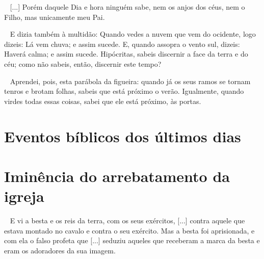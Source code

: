 \documentclass[12pt,aspectratio=169]{beamer}
\newcommand{\ver}[1]{%
    \raisebox{0.50ex}{%
        \scalebox{1.1}{%
            \pmb{\textbf{\textcolor{BSpbg}{#1}}}%
        }%
    }%
}
\newcommand{\QUOTE}[1]{%
    \par\noindent\hspace*{0.1\linewidth}%
    \begin{minipage}{0.8\linewidth}%
        \linespread{1.35}\large{#1}%
    \end{minipage}%
}
\newcommand{\RED}[1]{{\textcolor{TXred}{#1}}}
\newcommand{\ORA}[1]{{\textcolor{TXora}{#1}}}
\newcommand{\YEL}[1]{{\textcolor{TXyel}{#1}}}
\newcommand{\GRE}[1]{{\textcolor{TXgre}{#1}}}
\newcommand{\CYA}[1]{{\textcolor{TXcya}{#1}}}
\newcommand{\MAG}[1]{{\textcolor{TXmag}{#1}}}
\newcommand{\BRI}[1]{{\textcolor{BSpbg}{#1}}}   %
\begin{document}
    \begin{frame}
        \QUOTE{%
            \ver{(ARC) Mt~24.32--36}~%
            [...] Porém daquele \MAG{Dia e hora} ninguém sabe, nem os anjos dos céus, nem o
            Filho, mas unicamente meu Pai.
        }
    \end{frame}

    \begin{frame}
        \QUOTE{%
            \ver{(ARC) Lc~12.54--56}~%
            E \CYA{dizia} também à multidão: \YEL{Quando vedes}  a  \GRE{nuvem  que  vem  do
            ocidente}, logo \YEL{dizeis}: \GRE{Lá  vem  chuva};  \MAG{e  assim  sucede}.  E,
            \YEL{quando} \GRE{assopra o vento sul}, \YEL{dizeis}: \GRE{Haverá calma}; \MAG{e
            assim sucede}. \RED{Hipócritas, sabeis discernir a face da terra e do céu;  como
            não sabeis, então, discernir este tempo?}
        }
    \end{frame}

    \begin{frame}
        \QUOTE{%
            \ver{(ARC) Mt~24.32,33}~%
            \MAG{Aprendei}, pois, esta parábola da figueira: \YEL{quando}  \GRE{já  os  seus
            ramos se tornam tenros e brotam folhas}, \YEL{sabeis} \GRE{que  está  próximo  o
            verão}.  \MAG{Igualmente},  \YEL{quando}  \GRE{virdes   todas   essas   coisas},
            \YEL{sabei} que \GRE{ele está próximo, às portas}.
        }
    \end{frame}

\section{Eventos bíblicos dos últimos dias}

\section{Iminência do arrebatamento da igreja}

    \begin{frame}
        \QUOTE{%
            \ver{(ARA) Ap~19.19,20}~%
            E vi a \YEL{besta} e os reis da terra,  com  os  seus  exércitos,  [...]  contra
            \BRI{aquele que estava montado no  cavalo}  e  contra  o  seu  exército.  Mas  a
            \YEL{besta} foi aprisionada, e com ela o \ORA{falso profeta} que  [...]  seduziu
            aqueles que receberam a \MAG{marca da besta} e eram os  adoradores  da  \GRE{sua
            imagem}. \\[\bigskipamount]
        }
    \end{frame}
\end{document}
